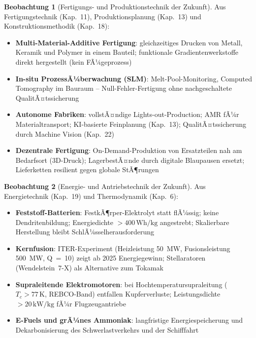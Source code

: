 ﻿\documentclass[a4paper,12pt]{report}
\theoremstyle{definition}
\newtheorem{beobachtung}{Beobachtung}
\begin{document}
\begin{beobachtung}[Fertigungs- und Produktionstechnik der Zukunft]
Aus Fertigungstechnik (Kap.~11), Produktionsplanung (Kap.~13) und
Konstruktionsmethodik (Kap.~18):
\begin{itemize}
    \item[-] \textbf{Multi-Material-Additive Fertigung}: gleichzeitiges Drucken
          von Metall, Keramik und Polymer in einem Bauteil; funktionale
          Gradientenwerkstoffe direkt hergestellt (kein FÃ¼geprozess)
    \item[-] \textbf{In-situ ProzessÃ¼berwachung (SLM)}: Melt-Pool-Monitoring,
          Computed Tomography im Bauraum -- Null-Fehler-Fertigung ohne
          nachgeschaltete QualitÃ¤tssicherung
    \item[-] \textbf{Autonome Fabriken}: vollstÃ¤ndige Lights-out-Production;
          AMR fÃ¼r Materialtransport; KI-basierte Feinplanung (Kap.~13);
          QualitÃ¤tssicherung durch Machine Vision (Kap.~22)
    \item[-] \textbf{Dezentrale Fertigung}: On-Demand-Produktion von Ersatzteilen
          nah am Bedarfsort (3D-Druck); LagerbestÃ¤nde durch digitale Blaupausen ersetzt;
          Lieferketten resilient gegen globale StÃ¶rungen
\end{itemize}
\end{beobachtung}

\begin{beobachtung}[Energie- und Antriebstechnik der Zukunft]
Aus Energietechnik (Kap.~19) und Thermodynamik (Kap.~6):
\begin{itemize}
    \item[-] \textbf{Feststoff-Batterien}: FestkÃ¶rper-Elektrolyt statt flÃ¼ssig;
          keine Dendritenbildung; Energiedichte $> 400\,\mathrm{Wh/kg}$ angestrebt;
          Skalierbare Herstellung bleibt SchlÃ¼sselherausforderung
    \item[-] \textbf{Kernfusion}: ITER-Experiment (Heizleistung 50~MW,
          Fusionsleistung 500~MW, Q~=~10) zeigt ab 2025 Energiegewinn;
          Stellaratoren (Wendelstein~7-X) als Alternative zum Tokamak
    \item[-] \textbf{Supraleitende Elektromotoren}: bei Hochtemperatursupraleitung
          ($T_c > 77\,\mathrm{K}$, REBCO-Band) entfallen Kupferverluste;
          Leistungsdichte $> 20\,\mathrm{kW/kg}$ fÃ¼r Flugzeugantriebe
    \item[-] \textbf{E-Fuels und grÃ¼nes Ammoniak}: langfristige Energiespeicherung
          und Dekarbonisierung des Schwerlastverkehrs und der Schifffahrt
\end{itemize}
\end{beobachtung}
\end{document}
